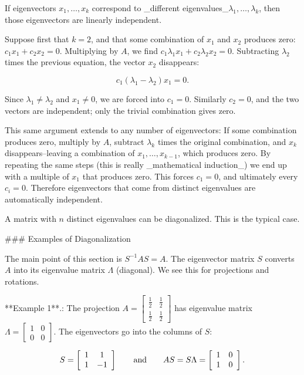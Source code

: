 If eigenvectors \(x_{1},\ldots,x_{k}\) correspond to _different eigenvalues_\(\lambda_{1},\ldots,\lambda_{k}\), then those eigenvectors are linearly independent.

Suppose first that \(k=2\), and that some combination of \(x_{1}\) and \(x_{2}\) produces zero: \(c_{1}x_{1}+c_{2}x_{2}=0\). Multiplying by \(A\), we find \(c_{1}\lambda_{1}x_{1}+c_{2}\lambda_{2}x_{2}=0\). Subtracting \(\lambda_{2}\) times the previous equation, the vector \(x_{2}\) disappears:

\[c_{1}(\lambda_{1}-\lambda_{2})x_{1}=0.\]

Since \(\lambda_{1}\neq\lambda_{2}\) and \(x_{1}\neq 0\), we are forced into \(c_{1}=0\). Similarly \(c_{2}=0\), and the two vectors are independent; only the trivial combination gives zero.

This same argument extends to any number of eigenvectors: If some combination produces zero, multiply by \(A\), subtract \(\lambda_{k}\) times the original combination, and \(x_{k}\) disappears--leaving a combination of \(x_{1},\ldots,x_{k-1}\), which produces zero. By repeating the same steps (this is really _mathematical induction_) we end up with a multiple of \(x_{1}\) that produces zero. This forces \(c_{1}=0\), and ultimately every \(c_{i}=0\). Therefore eigenvectors that come from distinct eigenvalues are automatically independent.

A matrix with \(n\) distinct eigenvalues can be diagonalized. This is the typical case.

### Examples of Diagonalization

The main point of this section is \(S^{-1}AS=A\). The eigenvector matrix \(S\) converts \(A\) into its eigenvalue matrix \(\Lambda\) (diagonal). We see this for projections and rotations.

**Example 1**.: The projection \(A=\left[\begin{array}{cc}\frac{1}{2}&\frac{1}{2}\\ \frac{1}{2}&\frac{1}{2}\end{array}\right]\) has eigenvalue matrix \(\Lambda=\left[\begin{smallmatrix}1&0\\ 0&0\end{smallmatrix}\right]\). The eigenvectors go into the columns of \(S\):

\[S=\left[\begin{array}{cc}1&1\\ 1&-1\end{array}\right]\qquad\text{and}\qquad AS=S\Lambda=\left[\begin{array}[] {cc}1&0\\ 1&0\end{array}\right].\]

